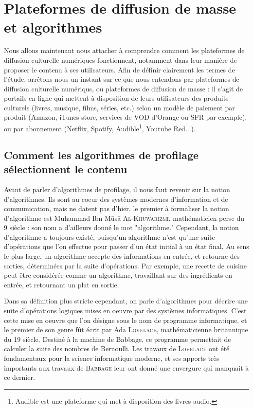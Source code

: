 \documentclass[a4paper,12pt]{report}
\begin{document}
\chapter{Plateformes de diffusion de masse et algorithmes}

Nous allons maintenant nous attacher à comprendre comment les plateformes de diffusion culturelle numériques fonctionnent, notamment dans leur manière de proposer le contenu à ses utilisateurs. Afin de définir clairement les termes de l'étude, arrêtons nous un instant sur ce que nous entendons par plateformes de diffusion culturelle numériqus, ou plateformes de diffusion de masse : il s'agit de portails en ligne qui mettent à disposition de leurs utilisateurs des produits culturels (livres, musique, films, séries, etc.) selon un modèle de paiement par produit (Amazon, iTunes store, services de VOD d'Orange ou SFR par exemple), ou par abonnement (Netflix, Spotify, Audible\footnote{Audible est une plateforme qui met à disposition des livres audio.}, Youtube Red...).

\section{Comment les algorithmes de profilage sélectionnent le contenu}

Avant de parler d'algorithmes de profilage, il nous faut revenir sur la notion d'algorithmes. Ils sont au coeur des systèmes modernes d'information et de communication, mais ne datent pas d'hier. le premier à formaliser la notion d'algorithme est Muhammad Ibn Mūsā \textsc{Al-Khuwārizmī}, mathématicien perse du 9 siècle : son nom a d'ailleurs donné le mot "algorithme." Cependant, la notion d'algorithme a toujours existé, puisqu'un algorithme n'est qu'une suite d'opérations que l'on effectue pour passer d'un état initial à un état final. Au sens le plus large, un algorithme accepte des informations en entrée, et retourne des sorties, déterminées par la suite d'opérations. Par exemple, une recette de cuisine peut être considérée comme un algorithme, travaillant sur des ingrédients en entrée, et retournant un plat en sortie. 

Dans sa définition plus stricte cependant, on parle d'algorithmes pour décrire une suite d'opérations logiques mises en oeuvre par des systèmes informatiques. C'est cette mise en oeuvre que l'on désigne sous le nom de programme informatique, et le premier de son genre fût écrit par Ada \textsc{Lovelace}, mathématicienne britannique du 19 siècle. Destiné à la machine de Babbage, ce programme permettait de calculer la suite des nombres de Bernoulli. Les travaux de \textsc{Lovelace} ont été fondamentaux pour la science informatique moderne, et ses apports très importants aux travaux de \textsc{Babbage} leur ont donné une envergure qui manquait à ce dernier.
\end{document}
